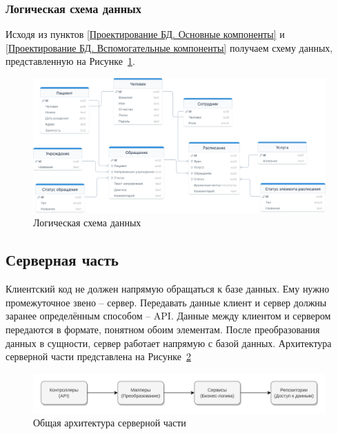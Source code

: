 \documentclass[a4paper,article]{article}
\begin{document}
    \subsubsection{Логическая схема данных}

    Исходя из пунктов \ref{Проектирование БД. Основные компоненты} и \ref{Проектирование БД. Вспомогательные компоненты} получаем схему данных, представленную на Рисунке~\ref{fig:Логическая схема данных}.

    \begin{figure}[h]

        \centering

        \includegraphics[width=0.9\linewidth]{Логическая схема данных.png}

        \caption{\centering Логическая схема данных}

        \label{fig:Логическая схема данных}

    \end{figure}

    \newpage

    \subsection{Серверная часть}

    Клиентский код не должен напрямую обращаться к базе данных. Ему нужно промежуточное звено -- сервер. Передавать данные клиент и сервер должны заранее определённым способом -- API. Данные между клиентом и сервером передаются в формате, понятном обоим элементам. После преобразования данных в сущности, сервер работает напрямую с базой данных. Архитектура серверной части представлена на Рисунке~\ref{fig:Архитектура серверной части}

    \begin{figure}[h]

        \centering

        \includegraphics[width=0.9\linewidth]{Архитектура серверной части.png}

        \caption{\centering Общая архитектура серверной части}

        \label{fig:Архитектура серверной части}

    \end{figure}
\end{document}
